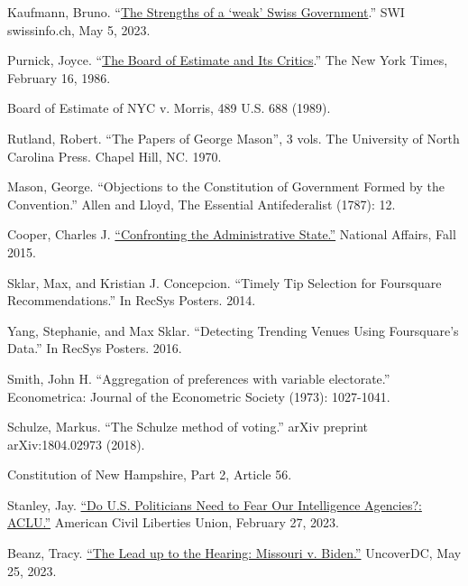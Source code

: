 \documentclass{article}
\newcommand{\quotes}[1]{``#1''}
\begin{document}
\begin{thebibliography}{20}
Kaufmann, Bruno. \quotes{\href{https://www.swissinfo.ch/eng/business/the-strengths-of-a--weak--swiss-government/48483858. }{The Strengths of a ‘weak’ Swiss Government}.} SWI swissinfo.ch, May 5, 2023. 

Purnick, Joyce. \quotes{\href{https://www.nytimes.com/1986/02/16/weekinreview/the-board-of-estimate-and-its-critics.html}{The Board of Estimate and Its Critics}.} The New York Times, February 16, 1986.

Board of Estimate of NYC v. Morris, 489 U.S. 688 (1989).

Rutland, Robert. \quotes{The Papers of George Mason}, 3 vols. The University of North Carolina Press. Chapel Hill, NC. 1970.

Mason, George. \quotes{Objections to the Constitution of Government Formed by the Convention.} Allen and Lloyd, The Essential Antifederalist (1787): 12.

Cooper, Charles J. \href{https://www.nationalaffairs.com/publications/detail/confronting-the-administrative-state}{\quotes{Confronting the Administrative State.}} National Affairs, Fall 2015.

Sklar, Max, and Kristian J. Concepcion. \quotes{Timely Tip Selection for Foursquare Recommendations.} In RecSys Posters. 2014.

Yang, Stephanie, and Max Sklar. \quotes{Detecting Trending Venues Using Foursquare's Data.} In RecSys Posters. 2016.

Smith, John H. \quotes{Aggregation of preferences with variable electorate.} Econometrica: Journal of the Econometric Society (1973): 1027-1041.

Schulze, Markus. \quotes{The Schulze method of voting.} arXiv preprint arXiv:1804.02973 (2018).

Constitution of New Hampshire, Part 2, Article 56.

Stanley, Jay. \href{https://www.aclu.org/news/national-security/do-us-politicians-need-fear-our-intelligence}{\quotes{Do U.S. Politicians Need to Fear Our Intelligence Agencies?: ACLU.}} American Civil Liberties Union, February 27, 2023.

Beanz, Tracy. \href{https://www.uncoverdc.com/2023/05/24/the-lead-up-to-the-hearing-missouri-v-biden/}{\quotes{The Lead up to the Hearing: Missouri v. Biden.}} UncoverDC, May 25, 2023. 


\end{thebibliography}
\end{document}
